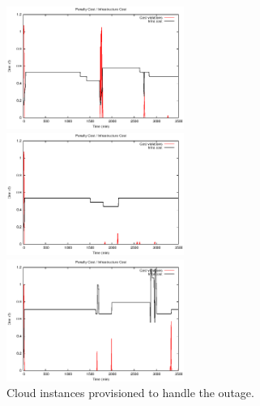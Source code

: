 \begin{figure}[htb]
	\begin{minipage}[b]{0.32\linewidth}
		\includegraphics[height=4cm]{images/exps2011/low/das/penaltyVScost.eps}	
		\vspace{-4mm}
	\end{minipage}
	\hfill
	\begin{minipage}[b]{0.32\linewidth}
		\includegraphics[height=4cm]{images/exps2011/medium/das/penaltyVScost.eps}
		\vspace{-4mm}
	\end{minipage}
\hfill
\begin{minipage}[b]{0.32\linewidth}
		\includegraphics[height=4cm]{images/exps2011/high/das/penaltyVScost.eps}
		\vspace{-4mm}
	\end{minipage}
\caption{Cloud instances provisioned to handle the outage.}
\label{fig:DASPenalty}
\end{figure}

